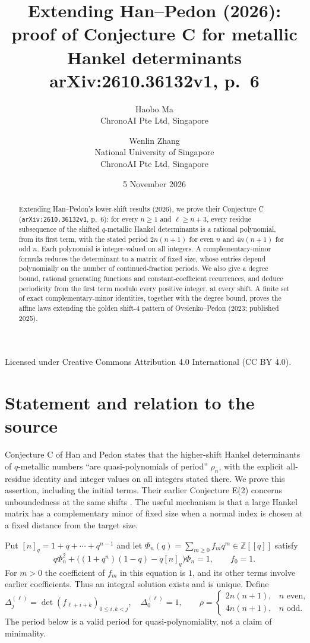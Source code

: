 \documentclass[11pt,a4paper]{article}
\title{Extending Han--Pedon (2026):\\
 proof of Conjecture C for metallic Hankel determinants\\
 \large arXiv:2610.36132v1, p.~6}
\author{Haobo Ma\\\small ChronoAI Pte Ltd, Singapore
 \and Wenlin Zhang\\\small National University of Singapore\\
 \small ChronoAI Pte Ltd, Singapore}
\date{5 November 2026}
\newcommand{\Z}{\mathbb Z}
\newcommand{\D}[2]{\Delta_{#1}^{(#2)}}
\begin{document}
\maketitle
\begin{abstract}
Extending Han--Pedon's lower-shift results (2026), we prove their
Conjecture C (\nolinkurl{arXiv:2610.36132v1}, p.~6): for every
$n\ge1$ and $\ell\ge n+3$, every residue subsequence of the shifted
$q$-metallic Hankel determinants is a rational polynomial, from its first
term, with the stated period $2n(n+1)$ for even $n$ and $4n(n+1)$ for odd
$n$. Each polynomial is integer-valued on all integers. A complementary-minor
formula reduces the determinant to a matrix of fixed size, whose entries
depend polynomially on the number of continued-fraction periods. We also
give a degree bound, rational generating functions and constant-coefficient
recurrences, and deduce periodicity from the first term modulo every positive
integer, at every shift. A finite set of exact complementary-minor identities,
together with the degree bound, proves the affine laws extending the golden
shift-$4$ pattern of Ovsienko--Pedon (2023; published 2025).
\end{abstract}
\begin{center}\small Licensed under Creative Commons Attribution 4.0
International (CC BY 4.0).\end{center}

\section{Statement and relation to the source}
Conjecture C of Han and Pedon \cite[p.~6]{HPplus} states that the higher-shift
Hankel determinants of $q$-metallic numbers ``are quasi-polynomials of
period'' $\rho_n$, with the explicit all-residue identity and integer values
on all integers stated there. We prove this assertion, including the initial
terms. Their earlier Conjecture E(2) concerns unboundedness at the same shifts
\cite[p.~9]{HP}. The useful mechanism is that a large Hankel
matrix has a complementary minor of fixed size when a normal index is
chosen at a fixed distance from the target size.

Put $[n]_q=1+q+\cdots+q^{n-1}$ and let
$\Phi_n(q)=\sum_{m\ge0}f_mq^m\in\Z[[q]]$ satisfy
\begin{equation}\label{quadratic}
 q\Phi_n^2+\bigl((1+q^n)(1-q)-q[n]_q\bigr)\Phi_n=1,
 \qquad f_0=1.
\end{equation}
For $m>0$ the coefficient of $f_m$ in this equation is $1$, and its other
terms involve earlier coefficients. Thus an integral solution exists and is
unique. Define
\[
 \D j\ell=\det(f_{\ell+i+k})_{0\le i,k<j},\quad \D0\ell=1,
 \qquad
 \rho=\begin{cases}2n(n+1),&n\text{ even},\\4n(n+1),&n\text{ odd}.\end{cases}
\]
The period below is a valid period for quasi-polynomiality, not a claim of
minimality.
\end{document}
